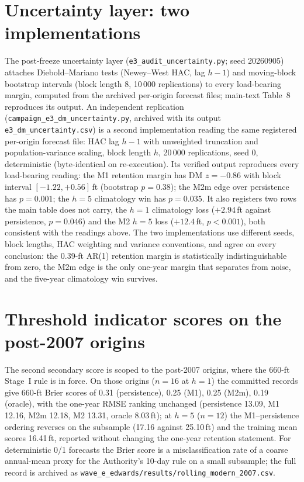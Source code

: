 \FloatBarrier
\section{Uncertainty layer: two implementations}\label{si:edwuncertainty}

The post-freeze uncertainty layer (\texttt{e3\_audit\_uncertainty.py}; seed 20260905) attaches Diebold--Mariano tests (Newey--West HAC, lag $h-1$) and moving-block bootstrap intervals (block length 8, 10\,000 replications) to every load-bearing margin, computed from the archived per-origin forecast files; main-text Table~8 reproduces its output. An independent replication (\texttt{campaign\_e3\_dm\_uncertainty.py}, archived with its output \texttt{e3\_dm\_uncertainty.csv}) is a second implementation reading the same registered per-origin forecast file: HAC lag $h-1$ with unweighted truncation and population-variance scaling, block length $h$, 20\,000 replications, seed 0, deterministic (byte-identical on re-execution). Its verified output reproduces every load-bearing reading: the M1 retention margin has DM $z=-0.86$ with block interval $[-1.22,+0.56]$\,ft (bootstrap $p=0.38$); the M2m edge over persistence has $p=0.001$; the $h=5$ climatology win has $p=0.035$. It also registers two rows the main table does not carry, the $h=1$ climatology loss ($+2.94$\,ft against persistence, $p=0.046$) and the M2 $h=5$ loss ($+12.4$\,ft, $p<0.001$), both consistent with the readings above. The two implementations use different seeds, block lengths, HAC weighting and variance conventions, and agree on every conclusion: the 0.39-ft AR(1) retention margin is statistically indistinguishable from zero, the M2m edge is the only one-year margin that separates from noise, and the five-year climatology win survives.

\section{Threshold indicator scores on the post-2007 origins}\label{si:edwbrier}

The second secondary score is scoped to the post-2007 origins, where the 660-ft Stage~I rule is in force. On those origins ($n=16$ at $h=1$) the committed records give 660-ft Brier scores of 0.31 (persistence), 0.25 (M1), 0.25 (M2m), 0.19 (oracle), with the one-year RMSE ranking unchanged (persistence 13.09, M1 12.16, M2m 12.18, M2 13.31, oracle 8.03\,ft); at $h=5$ ($n=12$) the M1--persistence ordering reverses on the subsample (17.16 against 25.10\,ft) and the training mean scores 16.41\,ft, reported without changing the one-year retention statement. For deterministic 0/1 forecasts the Brier score is a misclassification rate of a coarse annual-mean proxy for the Authority's 10-day rule on a small subsample; the full record is archived as \texttt{wave\_e\_edwards/results/rolling\_modern\_2007.csv}.

